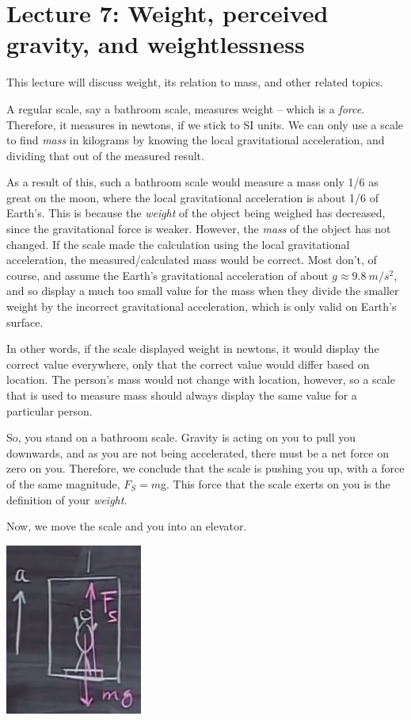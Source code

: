 \documentclass[12pt,a4paper]{report}
\begin{document}
\section{Lecture 7: Weight, perceived gravity, and weightlessness}

This lecture will discuss weight, its relation to mass, and other related topics.

A regular scale, say a bathroom scale, measures weight -- which is a \emph{force}. Therefore, it measures in newtons, if we stick to SI units. We can only use a scale to find \emph{mass} in kilograms by knowing the local gravitational acceleration, and dividing that out of the measured result.

As a result of this, such a bathroom scale would measure a mass only 1/6 as great on the moon, where the local gravitational acceleration is about 1/6 of Earth's. This is because the \emph{weight} of the object being weighed has decreased, since the gravitational force is weaker. However, the \emph{mass} of the object has not changed. If the scale made the calculation using the local gravitational acceleration, the measured/calculated mass would be correct. Most don't, of course, and assume the Earth's gravitational acceleration of about $g \approx \SI{9.8}{m/s^2}$, and so display a much too small value for the mass when they divide the smaller weight by the incorrect gravitational acceleration, which is only valid on Earth's surface.

In other words, if the scale displayed weight in newtons, it would display the correct value everywhere, only that the correct value would differ based on location. The person's mass would not change with location, however, so a scale that is used to measure mass should always display the same value for a particular person.

So, you stand on a bathroom scale. Gravity is acting on you to pull you downwards, and as you are not being accelerated, there must be a net force on zero on you. Therefore, we conclude that the scale is pushing you up, with a force of the same magnitude, $F_{S} = m $g. This force that the scale exerts on you is the definition of your \emph{weight}.

Now, we move the scale and you into an elevator.

\begin{center}
\includegraphics[scale=0.8]{Graphics/lec7_elevator}
\end{center}
\end{document}
